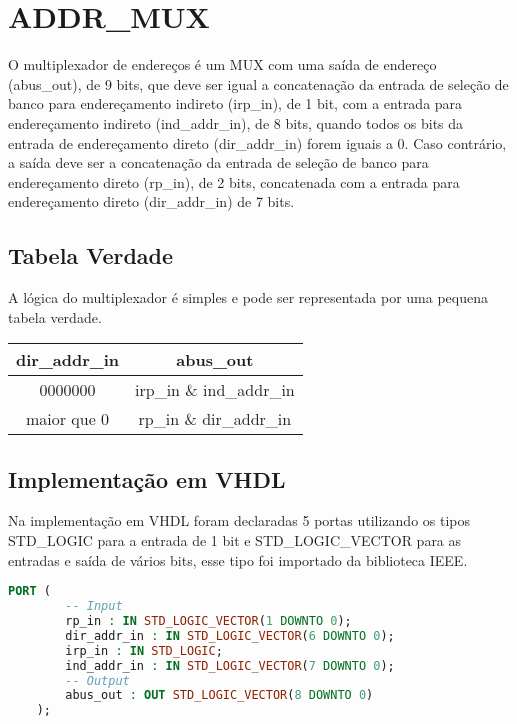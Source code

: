 \documentclass{article}
\begin{document}
\section{ADDR\_MUX}
O multiplexador de endereços é um MUX com uma saída de endereço (abus\_out), de 9 bits, que deve ser igual a concatenação da entrada de seleção de banco para endereçamento indireto (irp\_in), de 1 bit, com a entrada para endereçamento indireto (ind\_addr\_in), de 8 bits, quando todos os bits da entrada de endereçamento direto (dir\_addr\_in) forem iguais a 0. Caso contrário, a saída deve ser a concatenação da entrada de seleção de banco para endereçamento direto (rp\_in), de 2 bits, concatenada com a entrada para endereçamento direto (dir\_addr\_in) de 7 bits.

\subsection {Tabela Verdade}

A lógica do multiplexador é simples e pode ser representada por uma pequena tabela verdade.

\begin{center}
    \begin{tabular}{|c|c|}
        \hline
        dir\_addr\_in & abus\_out \\
        \hline
              0000000 & irp\_in \& ind\_addr\_in \\
        \hline
          maior que 0 & rp\_in \& dir\_addr\_in \\
        \hline
    \end{tabular}
\end{center}

\subsection {Implementação em VHDL}

Na implementação em VHDL foram declaradas 5 portas utilizando os tipos STD\_LOGIC para a entrada de 1 bit e STD\_LOGIC\_VECTOR para as entradas e saída de vários bits, esse tipo foi importado da biblioteca IEEE.

\begin{lstlisting}[language=VHDL]
	PORT (
		-- Input
		rp_in : IN STD_LOGIC_VECTOR(1 DOWNTO 0);
		dir_addr_in : IN STD_LOGIC_VECTOR(6 DOWNTO 0);
		irp_in : IN STD_LOGIC;
		ind_addr_in : IN STD_LOGIC_VECTOR(7 DOWNTO 0);
		-- Output
		abus_out : OUT STD_LOGIC_VECTOR(8 DOWNTO 0)
	);
\end{lstlisting}
\end{document}

